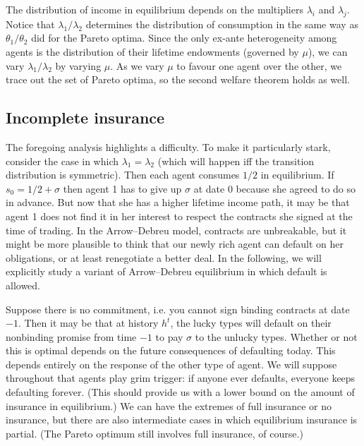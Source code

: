 \documentclass[11pt,letterpaper,reqno,oneside]{article}
\begin{document}
The distribution of income in equilibrium depends on the multipliers $\lambda_i$ and $\lambda_j$. Notice that $\lambda_1/\lambda_2$ determines the distribution of consumption in the same way as $\theta_1/\theta_2$ did for the Pareto optima. Since the only ex-ante heterogeneity among agents is the distribution of their lifetime endowments (governed by $\mu$), we can vary $\lambda_1/\lambda_2$ by varying $\mu$. As we vary $\mu$ to favour one agent over the other, we trace out the set of Pareto optima, so the second welfare theorem holds as well.



\subsection{Incomplete insurance}
\label{sec:19Oct2015:incomplete_insurance}

The foregoing analysis highlights a difficulty. To make it particularly stark, consider the case in which $\lambda_1 = \lambda_2$ (which will happen iff the transition distribution is symmetric). Then each agent consumes $1/2$ in equilibrium. If $s_0 = 1/2 + \sigma$ then agent 1 has to give up $\sigma$ at date $0$ because she agreed to do so in advance. But now that she has a higher lifetime income path, it may be that agent 1 does not find it in her interest to respect the contracts she signed at the time of trading. In the Arrow--Debreu model, contracts are unbreakable, but it might be more plausible to think that our newly rich agent can default on her obligations, or at least renegotiate a better deal. In the following, we will explicitly study a variant of Arrow--Debreu equilibrium in which default is allowed.

Suppose there is no commitment, i.e. you cannot sign binding contracts at date $-1$. Then it may be that at history $h^t$, the lucky types will default on their nonbinding promise from time $-1$ to pay $\sigma$ to the unlucky types. Whether or not this is optimal depends on the future consequences of defaulting today. This depends entirely on the response of the other type of agent. We will suppose throughout that agents play grim trigger: if anyone ever defaults, everyone keeps defaulting forever. (This should provide us with a lower bound on the amount of insurance in equilibrium.) We can have the extremes of full insurance or no insurance, but there are also intermediate cases in which equilibrium insurance is partial. (The Pareto optimum still involves full insurance, of course.)
\end{document}
